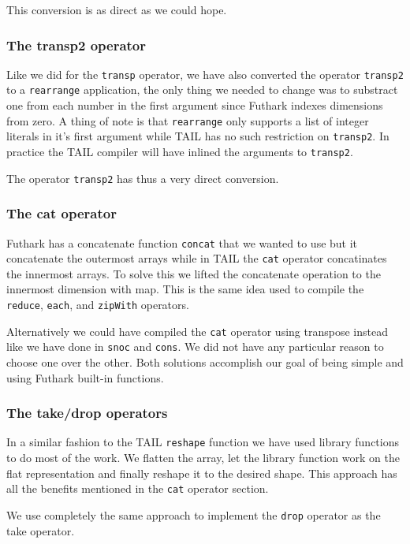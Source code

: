 \documentclass[11pt]{article}
\begin{document}
This conversion is as direct as we could hope.

\subsubsection{The transp2 operator} 
Like we did for the {\tt transp} operator, we have also converted the operator {\tt transp2} to a {\tt rearrange} application, the only thing we needed to change was to substract
one from each number in the first argument since Futhark indexes dimensions from zero\cite{TroelsHenriksen}.
A thing of note is that {\tt rearrange} only supports a list of integer literals in it's first argument while TAIL has no
such restriction on {\tt transp2}. In practice the TAIL compiler will have inlined the arguments to {\tt transp2}\cite{ElsmanDybdal:Array:2014}.

The operator {\tt transp2} has thus a very direct conversion.

\subsubsection{The cat operator} 
Futhark has a concatenate function {\tt concat} that we wanted to use but it concatenate the outermost arrays while in TAIL the {\tt cat} operator concatinates the innermost arrays\cite{TroelsHenriksen}\cite{ElsmanDybdal:Array:2014}.
To solve this we lifted the concatenate operation to the innermost dimension with map. This is the same idea used to compile the {\tt reduce}, {\tt each}, and {\tt zipWith} operators. 

Alternatively we could have compiled the {\tt cat} operator using transpose instead like we have done in {\tt snoc} and {\tt cons}.
We did not have any particular reason to choose one over the other. Both solutions accomplish our goal of being simple and using Futhark built-in functions. 

\subsubsection{The take/drop operators} 
In a similar fashion to the TAIL {\tt reshape} function we have used library functions to do most of the work.
We flatten the array, let the library function work on the flat representation and finally reshape it to the desired shape.
This approach has all the benefits mentioned in the {\tt cat} operator section.

We use completely the same approach to implement the {\tt drop} operator as the take operator.
\end{document}

